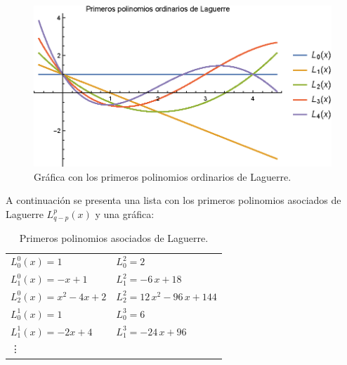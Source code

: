 \begin{figure}[H]
    \centering
    \includegraphics[scale=1.3]{Imagenes/Polinomios_Laguerre_01.eps}
    \caption{Gráfica con los primeros polinomios ordinarios de Laguerre.}
    \label{fig:grafica_Laguerre_01}
\end{figure}

A continuación se presenta una lista con los primeros polinomios asociados de Laguerre $L_{q-p}^{p}(x)$ y una gráfica:
\begin{table}[H]
\centering
\large
\begin{tabular}{l l}
$L_{0}^{0} (x) = 1$ & $L_{0}^{2} = 2$  \\
$L_{1}^{0} (x) = - x + 1$ & $L_{1}^{2} = -6 \, x + 18$ \\
$L_{2}^{0} (x) = x^{2} - 4 x + 2$ & $L_{2}^{2} = 12 \, x^{2} - 96 \, x + 144$ \\
$L_{0}^{1} (x) = 1$ & $L_{0}^{3} = 6$ \\
$L_{1}^{1} (x) = -2x + 4$ & $L_{1}^{3} = -24 \, x + 96$ \\
\vdots 
\end{tabular}
\caption{Primeros polinomios asociados de Laguerre.}
\label{table:tabla_02}
\end{table}

